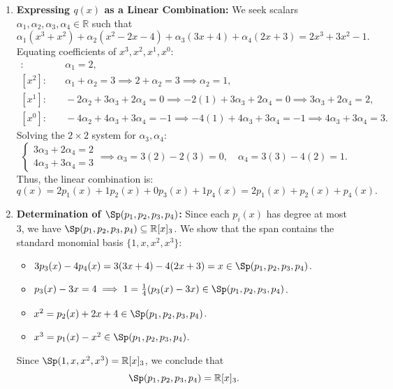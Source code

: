 \begin{exercisesolution*}
\label{sol:polynomial_linear_combination_span}
\begin{enumerate}[label=\textbf{(\alph*)}]
    \item \textbf{Expressing $q(x)$ as a Linear Combination:}
    We seek scalars $\alpha_1, \alpha_2, \alpha_3, \alpha_4 \in \mathbb{R}$ such that
    \[
    \alpha_1 (x^3 + x^2) + \alpha_2 (x^2 - 2x - 4) + \alpha_3 (3x + 4) + \alpha_4 (2x + 3) = 2x^3 + 3x^2 - 1.
    \]
    Equating coefficients of $x^3, x^2, x^1, x^0$:
    \begin{align*}
    [x^3]: & \quad \alpha_1 = 2, \\
    [x^2]: & \quad \alpha_1 + \alpha_2 = 3 \implies 2 + \alpha_2 = 3 \implies \alpha_2 = 1, \\
    [x^1]: & \quad -2\alpha_2 + 3\alpha_3 + 2\alpha_4 = 0 \implies -2(1) + 3\alpha_3 + 2\alpha_4 = 0 \implies 3\alpha_3 + 2\alpha_4 = 2, \\
    [x^0]: & \quad -4\alpha_2 + 4\alpha_3 + 3\alpha_4 = -1 \implies -4(1) + 4\alpha_3 + 3\alpha_4 = -1 \implies 4\alpha_3 + 3\alpha_4 = 3.
    \end{align*}
    Solving the $2 \times 2$ system for $\alpha_3, \alpha_4$:
    \[
    \begin{cases}
    3\alpha_3 + 2\alpha_4 = 2 \\
    4\alpha_3 + 3\alpha_4 = 3
    \end{cases}
    \implies
    \alpha_3 = 3(2) - 2(3) = 0, \quad \alpha_4 = 3(3) - 4(2) = 1.
    \]
    Thus, the linear combination is:
    \[
    q(x) = 2 p_1(x) + 1 p_2(x) + 0 p_3(x) + 1 p_4(x) = 2 p_1(x) + p_2(x) + p_4(x).
    \]

    \item \textbf{Determination of $\Sp(p_1, p_2, p_3, p_4)$:}
    Since each $p_i(x)$ has degree at most $3$, we have $\Sp(p_1, p_2, p_3, p_4) \subseteq \mathbb{R}[x]_3$. We show that the span contains the standard monomial basis $\{1, x, x^2, x^3\}$:
    \begin{itemize}
        \item $3 p_3(x) - 4 p_4(x) = 3(3x + 4) - 4(2x + 3) = x \in \Sp(p_1, p_2, p_3, p_4)$.
        \item $p_3(x) - 3x = 4 \implies 1 = \frac{1}{4}(p_3(x) - 3x) \in \Sp(p_1, p_2, p_3, p_4)$.
        \item $x^2 = p_2(x) + 2x + 4 \in \Sp(p_1, p_2, p_3, p_4)$.
        \item $x^3 = p_1(x) - x^2 \in \Sp(p_1, p_2, p_3, p_4)$.
    \end{itemize}
    Since $\Sp(1, x, x^2, x^3) = \mathbb{R}[x]_3$, we conclude that
    \[
    \Sp(p_1, p_2, p_3, p_4) = \mathbb{R}[x]_3.
    \]
\end{enumerate}
\end{exercisesolution*}

